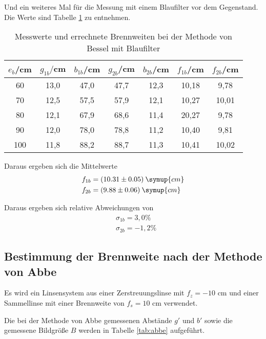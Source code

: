Und ein weiteres Mal für die Messung mit einem Blaufilter vor dem Gegenstand. Die Werte sind Tabelle
\ref{tab:besselblau} zu entnehmen.
\begin{table}[H]
  \centering
  \caption{Messwerte und errechnete Brennweiten bei der Methode von Bessel mit Blaufilter}
  \label{tab:besselblau}
  \begin{tabular}{c c c c c c c}
    \toprule
    $e_b$/cm  & $g_{1b}/$cm & $b_{1b}$/cm & $g_{2b}$/cm & $b_{2b}$/cm & $f_{1b}$/cm & $f_{2b}$/cm \\
    \midrule
    60  &   13,0 &  47,0  &  47,7  &  12,3 & 10,18 & 9,78 \\
    70   &  12,5 &  57,5  &  57,9  &  12,1 & 10,27 & 10,01 \\
    80   &  12,1 &  67,9  &  68,6  &  11,4 & 20,27 & 9,78 \\
    90   &  12,0 &  78,0  &  78,8  &  11,2 & 10,40 & 9,81 \\
    100  &  11,8 &  88,2  &  88,7  &  11,3 & 10,41 & 10,02 \\
    \bottomrule
  \end{tabular}
\end{table}

Daraus ergeben sich die Mittelwerte
\begin{align*}
  &f_{1b} = (10.31 \pm 0.05) \: \symup{cm} \\
  &f_{2b} = (9.88 \pm 0.06) \: \symup{cm}
\end{align*}

Daraus ergeben sich relative Abweichungen von
\begin{align*}
  &\sigma_{1b} = 3,0 \% \\
  &\sigma_{2b} = -1,2 \%
\end{align*}

\subsection{Bestimmung der Brennweite nach der Methode von Abbe}
Es wird ein Linsensystem aus einer Zerstreuungslinse mit $f_z = -10$ cm und einer Sammellinse
mit einer Brennweite von $f_s = 10$ cm verwendet.

Die bei der Methode von Abbe gemessenen Abstände $g'$ und $b'$ sowie die gemessene Bildgröße $B$
werden in Tabelle \ref{tab:abbe} aufgeführt.

